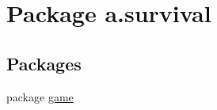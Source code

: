 \hypertarget{namespacea_1_1survival}{}\section{Package a.\+survival}
\label{namespacea_1_1survival}
\subsection*{Packages}
\begin{DoxyCompactItemize}
\item 
package \hyperlink{namespacea_1_1survival_1_1game}{game}
\end{DoxyCompactItemize}
